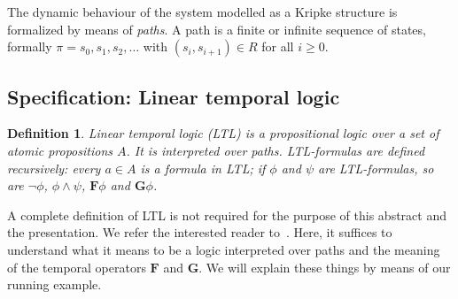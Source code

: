 \documentclass[11pt]{article}
\newtheorem{definition}{Definition}
\begin{document}
The dynamic behaviour of the system modelled as a Kripke structure is formalized by means of \emph{paths}.
A path is a finite or infinite sequence of states, formally $\pi = s_0, s_1, s_2, \ldots$ with $(s_i,s_{i+1}) \in R$ for all $i\geq 0$.


\subsection{Specification: Linear temporal logic}

\begin{definition}
	Linear temporal logic (LTL) is a propositional logic over a set of atomic propositions $A$. It is interpreted over paths.
	LTL-formulas are defined recursively:
	every $a \in A$ is a formula in LTL; if $\phi$ and $\psi$ are LTL-formulas, so are $\neg \phi$, $\phi \wedge \psi$, $\mathbf{F} \phi$ and $\mathbf{G} \phi$.
\end{definition}

A complete definition of LTL is not required for the purpose of this abstract and the presentation. We refer the interested reader to~\cite[Chapter 2.3.1]{handbook}. 
Here, it suffices to understand what it means to be a logic interpreted over paths and the meaning of the temporal operators $\mathbf F$ and $\mathbf G$.
We will explain these things by means of our running example.
\end{document}
